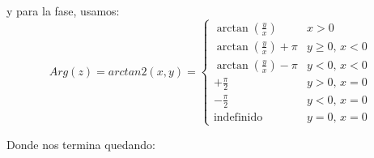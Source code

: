 \documentclass[a4paper,12pt]{report}
\begin{document}
\begin{enumerate}[label=\alph*), left=0pt]
    y para la fase, usamos:
    \begin{equation}
      \label{fase}
      Arg(z) = arctan2(x, y) = 
      \begin{cases}
        \arctan\left(\frac{y}{x}\right) & x > 0 \\
        \arctan\left(\frac{y}{x}\right) + \pi & y \geq 0, \, x < 0 \\
        \arctan\left(\frac{y}{x}\right) - \pi & y < 0, \, x < 0 \\
        +\frac{\pi}{2} & y > 0, \, x = 0 \\
        -\frac{\pi}{2} & y < 0, \, x = 0 \\
        \text{indefinido} & y = 0, \, x = 0
      \end{cases}
    \end{equation}

    Donde nos termina quedando:


\end{enumerate}
\end{document}

